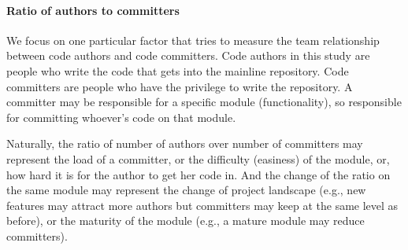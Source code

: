 \documentclass{sig-alternate-05-2015}
\begin{document}
\paragraph{Ratio of authors to committers}
We focus on one particular factor that tries to measure the team relationship between
code authors and code committers. Code authors in this study are people who
write the code that gets into the mainline repository. Code committers are
people who have the privilege to write the repository. A committer may be
responsible for a specific module (functionality), so responsible for committing
whoever's code on that module.
%
%


Naturally, the ratio of number of authors over number of committers may represent the load of a committer, or the difficulty (easiness) of the module, or, how hard it is for the author to
get her code in. And the change of the ratio on the same module may represent
the change of project landscape (e.g., new features may attract more authors but
committers may keep at the same level as before), or the maturity of the module (e.g.,
a mature module may reduce committers).
\end{document}
